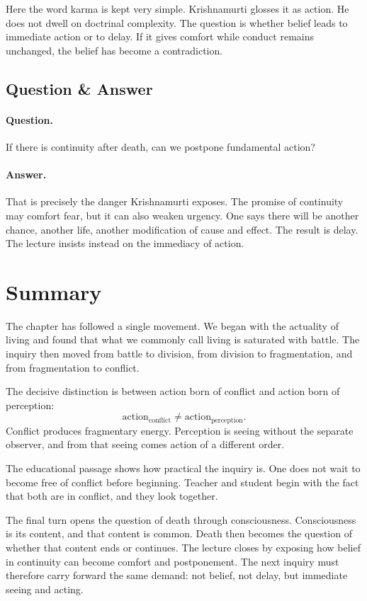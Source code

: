 Here the word karma is kept very simple. Krishnamurti glosses it as action. He does not dwell on doctrinal complexity. The question is whether belief leads to immediate action or to delay. If it gives comfort while conduct remains unchanged, the belief has become a contradiction.

\subsection{Question \& Answer}

\paragraph{Question.}
If there is continuity after death, can we postpone fundamental action?

\paragraph{Answer.}
That is precisely the danger Krishnamurti exposes. The promise of continuity may comfort fear, but it can also weaken urgency. One says there will be another chance, another life, another modification of cause and effect. The result is delay. The lecture insists instead on the immediacy of action.

\section{Summary}

The chapter has followed a single movement. We began with the actuality of living and found that what we commonly call living is saturated with battle. The inquiry then moved from battle to division, from division to fragmentation, and from fragmentation to conflict.

The decisive distinction is between action born of conflict and action born of perception:
\begin{equation}
\text{action}_{\mathrm{conflict}}
   \neq
\text{action}_{\mathrm{perception}}.
\end{equation}
Conflict produces fragmentary energy. Perception is seeing without the separate observer, and from that seeing comes action of a different order.

The educational passage shows how practical the inquiry is. One does not wait to become free of conflict before beginning. Teacher and student begin with the fact that both are in conflict, and they look together.

The final turn opens the question of death through consciousness. Consciousness is its content, and that content is common. Death then becomes the question of whether that content ends or continues. The lecture closes by exposing how belief in continuity can become comfort and postponement. The next inquiry must therefore carry forward the same demand: not belief, not delay, but immediate seeing and acting.